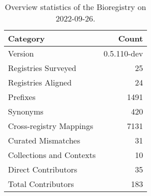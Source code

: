 \begin{table}
\centering
\caption{Overview statistics of the Bioregistry on 2022-09-26.}
\label{tab:bioregistry-summary}
\begin{tabular}{lr}
\toprule
                Category &       Count \\
\midrule
                 Version & 0.5.110-dev \\
     Registries Surveyed &          25 \\
      Registries Aligned &          24 \\
                Prefixes &        1491 \\
                Synonyms &         420 \\
 Cross-registry Mappings &        7131 \\
      Curated Mismatches &          31 \\
Collections and Contexts &          10 \\
     Direct Contributors &          35 \\
      Total Contributors &         183 \\
\bottomrule
\end{tabular}
\end{table}
